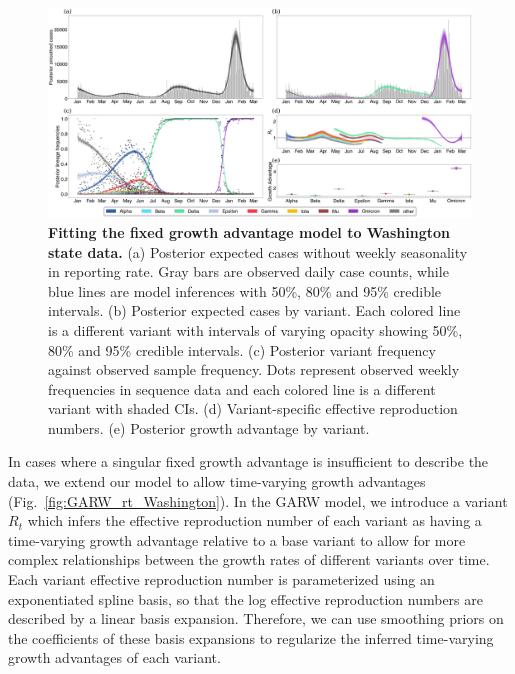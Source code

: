 \documentclass[11pt,oneside,letterpaper]{article}
\def\tbc#1{\textcolor{purple}{[#1]}}
\begin{document}
\begin{figure}[h!]
  \centering
  \includegraphics[width=\linewidth]{figs/fixed_growth_Washington.png}
  \caption{\textbf{Fitting the fixed growth advantage model to Washington state data.}
  (a) Posterior expected cases without weekly seasonality in reporting rate.
  Gray bars are observed daily case counts, while blue lines are model inferences with 50\%, 80\% and 95\% credible intervals.
  (b) Posterior expected cases by variant.
  Each colored line is a different variant with intervals of varying opacity showing 50\%, 80\% and 95\% credible intervals.
  (c) Posterior variant frequency against observed sample frequency.
  Dots represent observed weekly frequencies in sequence data and each colored line is a different variant with shaded CIs.
  (d) Variant-specific effective reproduction numbers.
  (e) Posterior growth advantage by variant.
  }
  \label{fig:fixed_growth_Washington}
\end{figure}

In cases where a singular fixed growth advantage is insufficient to describe the data, we extend our model to allow time-varying growth advantages (Fig.~\ref{fig:GARW_rt_Washington}).
In the GARW model, we introduce a variant $R_{t}$ which infers the effective reproduction number of each variant as having a time-varying growth advantage relative to a base variant to allow for more complex relationships between the growth rates of different variants over time.
Each variant effective reproduction number is parameterized using an exponentiated spline basis, so that the log effective reproduction numbers are described by a linear basis expansion.
Therefore, we can use smoothing priors on the coefficients of these basis expansions to regularize the inferred time-varying growth advantages of each variant.
\end{document}
